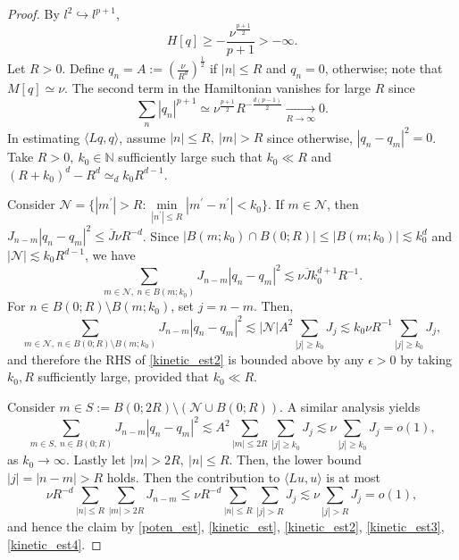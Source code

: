 \documentclass{article}
\numberwithin{equation}{section}
\begin{document}
\begin{proof}
By $l^2 \hookrightarrow l^{p+1}$,
\begin{equation*}
H[q] \geq -\frac{\nu^{\frac{p+1}{2}}}{p+1} > - \infty.   \end{equation*}
Let $R>0$. Define $q_n = A := (\frac{\nu}{R^d})^{\frac{1}{2}}$ if $|n| \leq R$ and $q_n = 0$, otherwise; note that $M[q] \simeq \nu$. The second term in the Hamiltonian vanishes for large $R$ since
\begin{equation}\label{poten_est}
    \sum_n |q_n|^{p+1} \simeq \nu^{\frac{p+1}{2}} R^{-\frac{d(p-1)}{2}} \xrightarrow[R \rightarrow \infty]{} 0.
\end{equation}
In estimating $\langle Lq,q \rangle$, assume $|n| \leq R,\ |m| > R$ since otherwise, $|q_n - q_m|^2 = 0$.  Take $R>0,\ k_0 \in \mathbb{N}$ sufficiently large such that $k_0 \ll R$ and $(R + k_0)^d - R^d \simeq_d k_0 R^{d-1}$.

Consider $\mathcal{N} = \{|m^\prime| > R: \min\limits_{|n^\prime| \leq R} |m^\prime - n^\prime| < k_0 \}$. If $m \in \mathcal{N}$, then $J_{n-m}|q_n - q_m|^2 \leq \overline{J}\nu R^{-d}$. Since $|B(m;k_0) \cap B(0;R)| \leq |B(m;k_0)| \lesssim k_0^d$ and $|\mathcal{N}| \lesssim k_0 R^{d-1}$, we have
\begin{equation}\label{kinetic_est}
\sum_{m \in \mathcal{N},\ n \in B(m;k_0)} J_{n-m}|q_n - q_m|^2 \lesssim \nu \overline{J} k_0^{d+1}R^{-1}. 
\end{equation}
For $n \in B(0;R) \setminus B(m;k_0)$, set $j = n-m$. Then,
\begin{equation}\label{kinetic_est2}
    \sum_{m \in \mathcal{N},\ n \in B(0;R) \setminus B(m;k_0)} J_{n-m}|q_n - q_m|^2 \lesssim |\mathcal{N}| A^2 \sum_{|j|\geq k_0} J_{j} \lesssim k_0 \nu R^{-1} \sum_{|j|\geq k_0} J_{j}, 
\end{equation}
and therefore the RHS of \eqref{kinetic_est2} is bounded above by any $\epsilon > 0$ by taking $k_0, R$ sufficiently large, provided that $k_0 \ll R$.

Consider $m \in S := B(0;2R) \setminus (\mathcal{N} \cup B(0;R))$. A similar analysis yields
\begin{equation}\label{kinetic_est3}
    \sum_{m \in S,\ n \in B(0;R)} J_{n-m} |q_n - q_m|^2 \lesssim A^2 \sum_{|m| \leq 2R} \sum_{|j|\geq k_0} J_{j} \lesssim \nu \sum_{|j|\geq k_0} J_{j} = o(1),
\end{equation}
as $k_0 \rightarrow \infty$. Lastly let $|m| > 2R,\ |n| \leq R$. Then, the lower bound $|j| = |n-m| > R$ holds. Then the contribution to $\langle Lu,u\rangle$ is at most
\begin{equation}\label{kinetic_est4}
    \nu R^{-d} \sum_{|n| \leq R} \sum_{|m| > 2R} J_{n-m} \leq \nu R^{-d} \sum_{|n| \leq R} \sum_{|j| > R} J_{j} \lesssim \nu   \sum_{|j| > R} J_{j} = o(1),
\end{equation}
and hence the claim by \eqref{poten_est}, \eqref{kinetic_est}, \eqref{kinetic_est2}, \eqref{kinetic_est3}, \eqref{kinetic_est4}.
\end{proof}
\end{document}
